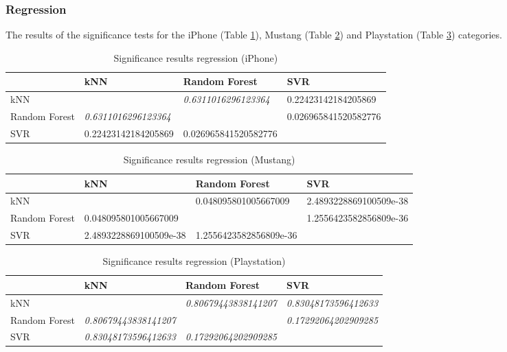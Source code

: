 \subsubsection{Regression}
The results of the significance tests for the iPhone (Table \ref{tab_sig_reg_iphone}), Mustang (Table \ref{tab_sig_reg_mustang}) and Playstation (Table \ref{tab_sig_reg_playstation}) categories.
\begin{table}[h]
	\begin{center}
	\begin{tabular}{| p{3.25cm} || p{3.25cm} | p{3.25cm} | p{3.25cm} |}
		\hline
		& kNN & Random Forest & SVR \\
		\hline \hline
		kNN & & \textit{0.6311016296123364} & 0.22423142184205869 \\
		\hline
		Random Forest & \textit{0.6311016296123364} & & 0.026965841520582776 \\
		\hline
		SVR & 0.22423142184205869 & 0.026965841520582776 & \\
		\hline
	\end{tabular}
	\end{center}
	\caption{Significance results regression (iPhone)}
	\label{tab_sig_reg_iphone}
\end{table}
\begin{table}[h]
	\begin{center}
	\begin{tabular}{| p{3.25cm} || p{3.25cm} | p{3.25cm} | p{3.25cm} |}
		\hline
		& kNN & Random Forest & SVR \\
		\hline \hline
		kNN & & 0.048095801005667009 & 2.4893228869100509e-38 \\
		\hline
		Random Forest & 0.048095801005667009 & & 1.2556423582856809e-36 \\
		\hline
		SVR & 2.4893228869100509e-38 & 1.2556423582856809e-36 & \\
		\hline
	\end{tabular}
	\end{center}
	\caption{Significance results regression (Mustang)}
	\label{tab_sig_reg_mustang}
\end{table}
\begin{table}[h]
	\begin{center}
	\begin{tabular}{| p{3.25cm} || p{3.25cm} | p{3.25cm} | p{3.25cm} |}
		\hline
		& kNN & Random Forest & SVR \\
		\hline \hline
		kNN & & \textit{0.80679443838141207} & \textit{0.83048173596412633} \\
		\hline
		Random Forest & \textit{0.80679443838141207} & & \textit{0.17292064202909285} \\
		\hline
		SVR & \textit{0.83048173596412633} & \textit{0.17292064202909285} & \\
		\hline
	\end{tabular}
	\end{center}
	\caption{Significance results regression (Playstation)}
	\label{tab_sig_reg_playstation}
\end{table}

